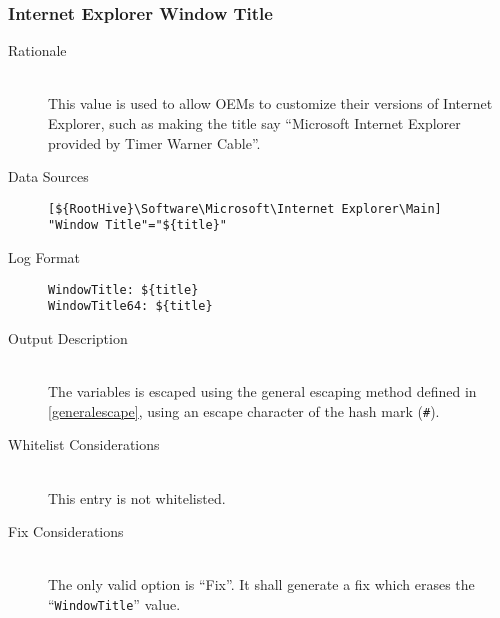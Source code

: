 \subsubsection{Internet Explorer Window Title}
\begin{description}
\item[Rationale]  \hfill \\ This value is used to allow OEMs to customize their
versions of Internet Explorer, such as making the title say ``Microsoft Internet
Explorer provided by Timer Warner Cable''.

\item[Data Sources] \hfill
\vspace{-\baselineskip}
\begin{verbatim}
[${RootHive}\Software\Microsoft\Internet Explorer\Main]
"Window Title"="${title}"
\end{verbatim}
\item[Log Format] \hfill
\vspace{-\baselineskip}
\begin{verbatim} 
WindowTitle: ${title}
WindowTitle64: ${title}
\end{verbatim}
\item[Output Description] \hfill \\
The variables  is escaped using the general
escaping method defined in \ref{generalescape}, using an escape character of
the hash mark (\verb|#|).
\item[Whitelist Considerations] \hfill \\
This entry is not whitelisted.
\item[Fix Considerations] \hfill \\
The only valid option is ``Fix''. It shall generate a fix which erases the
``\verb|WindowTitle|'' value.
\end{description}


